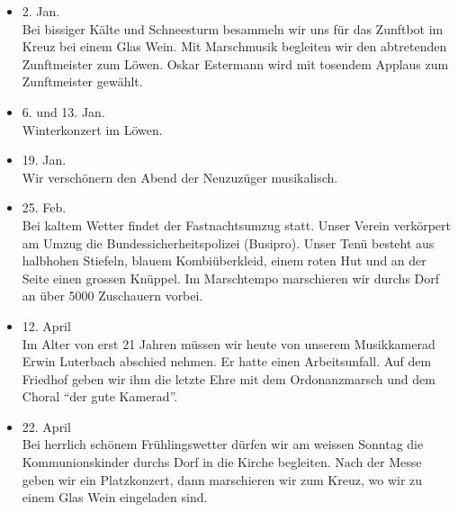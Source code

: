 \begin{multicols}{2}


    \begin{itemize}

        \item[]2. Jan.\\
        Bei bissiger Kälte und Schneesturm besammeln wir uns für das Zunftbot im
        Kreuz bei einem Glas Wein. Mit Marschmusik begleiten wir den abtretenden
        Zunftmeister zum Löwen. Oskar Estermann wird mit tosendem Applaus zum
        Zunftmeister gewählt.

        \item[]6. und 13. Jan.\\
        Winterkonzert im Löwen.

        \item[]19. Jan.\\
        Wir verschönern den Abend der Neuzuzüger musikalisch.

        \item[]25. Feb.\\
        Bei kaltem Wetter findet der Fastnachtsumzug statt. Unser Verein
        verkörpert am Umzug die Bundessicherheitspolizei (Busipro). Unser Tenü
        besteht aus halbhohen Stiefeln, blauem Kombiüberkleid, einem roten Hut
        und an der Seite einen grossen Knüppel. Im Marschtempo marschieren wir
        durchs Dorf an über 5000 Zuschauern vorbei.

        \item[]12. April\\
        Im Alter von erst 21 Jahren müssen wir heute von unserem Musikkamerad
        Erwin Luterbach abschied nehmen. Er hatte einen Arbeitsunfall. Auf dem
        Friedhof geben wir ihm die letzte Ehre mit dem Ordonanzmarsch und dem
        Choral "`der gute Kamerad"'.

        \item[]22. April\\
        Bei herrlich schönem Frühlingswetter dürfen wir am weissen Sonntag die
        Kommunionskinder durchs Dorf in die Kirche begleiten. Nach der Messe
        geben wir ein Platzkonzert, dann marschieren wir zum Kreuz, wo wir zu
        einem Glas Wein eingeladen sind.


\end{itemize}
\end{multicols}
